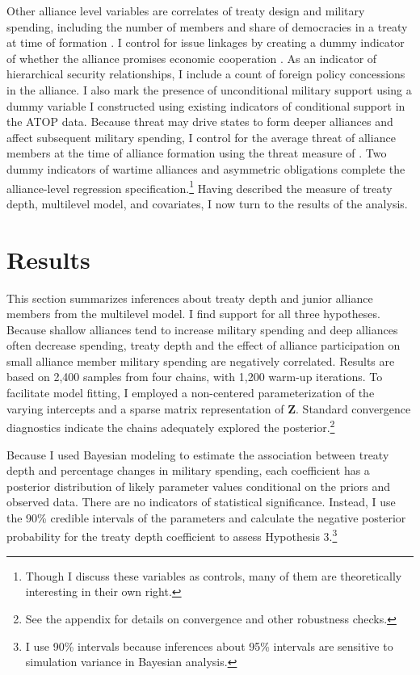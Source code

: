 \documentclass[12pt]{article}
\begin{document}
 
Other alliance level variables are correlates of treaty design and military spending, including the number of members and share of democracies in a treaty at time of formation \citep{Chibaetal2015}. 
I control for issue linkages by creating a dummy indicator of whether the alliance promises economic cooperation \citep{Poast2013, LongLeeds2006}. 
As an indicator of hierarchical security relationships, I include a count of foreign policy concessions in the alliance. 
I also mark the presence of unconditional military support using a dummy variable I constructed using existing indicators of conditional support in the ATOP data. 
Because threat may drive states to form deeper alliances and affect subsequent military spending, I control for the average threat of alliance members at the time of alliance formation using the threat measure of \citet{LeedsSavun2007}. 
Two dummy indicators of wartime alliances and asymmetric obligations \citep{Leedsetal2002} complete the alliance-level regression specification.\footnote{Though I discuss these variables as controls, many of them are theoretically interesting in their own right.}  
Having described the measure of treaty depth, multilevel model, and covariates, I now turn to the results of the analysis. 

 

\section{Results}


This section summarizes inferences about treaty depth and junior alliance members from the multilevel model. 
I find support for all three hypotheses. 
Because shallow alliances tend to increase military spending and deep alliances often decrease spending, treaty depth and the effect of alliance participation on small alliance member military spending are negatively correlated. 
Results are based on 2,400 samples from four chains, with 1,200 warm-up iterations. 
To facilitate model fitting, I employed a non-centered parameterization of the varying intercepts and a sparse matrix representation of \textbf{Z}. 
Standard convergence diagnostics indicate the chains adequately explored the posterior.\footnote{See the appendix for details on convergence and other robustness checks.} 


Because I used Bayesian modeling to estimate the association between treaty depth and percentage changes in military spending, each coefficient has a posterior distribution of likely parameter values conditional on the priors and observed data.
There are no indicators of statistical significance. 
Instead, I use the 90\% credible intervals of the parameters and calculate the negative posterior probability for the treaty depth coefficient to assess Hypothesis 3.\footnote{I use 90\% intervals because inferences about 95\% intervals are sensitive to simulation variance in Bayesian analysis.}
\end{document}

